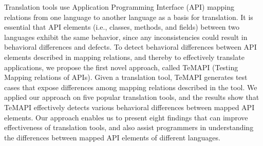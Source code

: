 Translation tools use Application Programming Interface (API) mapping relations from one language to another language as a basis for translation. It is essential that API elements (i.e., classes, methods, and fields) between two languages exhibit the same behavior, since any inconsistencies could result in behavioral differences and defects. To detect behavioral differences between API elements described in mapping relations, and thereby to effectively translate applications, we propose the first novel approach, called TeMAPI (Testing Mapping relations of APIs). Given a translation tool, TeMAPI generates test cases that expose differences among mapping relations described in the tool. We applied our approach on five popular translation tools, and the results show that TeMAPI effectively detects various behavioral differences between mapped API elements. Our approach enables us to present eight findings that can improve effectiveness of translation tools, and also assist programmers in understanding the differences between mapped API elements of different languages. 
